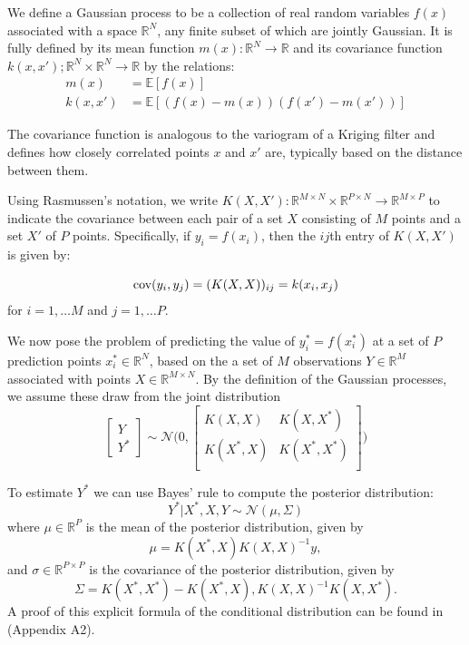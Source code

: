\documentclass[conference]{IEEEtran}
\newcommand{\mat}[1]{\begin{bmatrix} #1 \end{bmatrix}}
\newcommand{\R}{\mathbb{R}}
\newcommand{\E}{\mathbb{E}}
\newcommand{\normal}{\mathcal{N}}
\begin{document}
\newcommand{\X}{\mathcal{X}}

We define a Gaussian process to be a collection of real random variables
$f(x)$ associated with a space $\R^N$, any finite subset of 
which are jointly Gaussian. It is fully defined by its mean
function $m(x): \R^N \to \R$ and its covariance function
$k(x, x'); \R^N \times \R^N \to \R$ by the relations:
\begin{align*}
    m(x) &= \E[f(x)] \\
    k(x, x') &= \E[(f(x) - m(x))(f(x') - m(x'))]
\end{align*}

The covariance function is analogous to the variogram of a Kriging
filter and defines how closely correlated points $x$ and $x'$ are,
typically based on the distance between them.

Using Rasmussen's notation, we write
$K(X, X'): \R^{M\times N} \times \R^{P\times N} \to \R^{M\times P}$
to indicate the covariance between each pair of a set $X$
consisting of $M$ points and a set $X'$ of $P$ points. 
Specifically, if 
$y_i = f(x_i)$, then the $ij$th entry of $K(X, X')$ is given by:

\begin{equation*}
    \label{eq:covariance-def}
    \text{cov}(y_i, y_j) = (K(X, X))_{ij} = k(x_i, x_j)  \\
\end{equation*}
for $i=1,\dots M$ and $j=1,\dots P$.

We now pose the problem of predicting the value of $y_i^*=f(x_i^*)$
at a set of $P$ prediction points $x_i^*\in\R^N$, based on the
a set of $M$ observations $Y\in\R^M$ associated with
points $X\in\R^{M\times N}$.
By the definition of the Gaussian processes, we assume these
draw from the joint distribution
\begin{equation*}
    \mat{Y \\ Y^*} \sim \normal\biggl(0, \mat{
        K(X, X) & K(X, X^*) \\
        K(X^*, X) & K(X^*, X^*) \\
    }\biggr)
\end{equation*}

To estimate $Y^*$ we can use Bayes' rule to compute the posterior
distribution:
\begin{equation} \label{eq:posterior-dist}
    Y^* | X^*, X, Y \sim \normal(\mu, \Sigma)  
\end{equation}
where $\mu\in\R^P$ is the mean of the posterior distribution, given by
\begin{equation*} \label{eq:mu}
    \mu = K(X^*, X) K(X, X)^{-1} y,
\end{equation*}
and $\sigma\in \R^{P\times P}$ is the covariance of the posterior
distribution, given by
\begin{equation*}
    \Sigma = K(X^*, X^*) - K(X^*,  X), K(X, X)^{-1} K(X, X^*).
\end{equation*}
A proof of this explicit formula of the conditional distribution 
can be found in \cite{williams_gaussian_2006}(Appendix A2).
\end{document}
